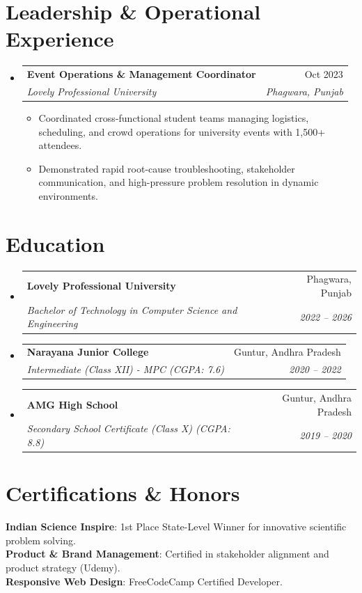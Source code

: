 \documentclass[letterpaper,10.8pt]{article}
\makeatletter
\newcommand{\resumeItem}[1]{
  \item\small{
    {#1 \vspace{-2.2pt}}
  }
}
\newcommand{\resumeSubheading}[4]{
  \vspace{-2pt}\item
    \begin{tabular*}{0.97\textwidth}[t]{l@{\extracolsep{\fill}}r}
      \textbf{#1} & #2 \\
      \textit{\small#3} & \textit{\small #4} \\
    \end{tabular*}\vspace{-6pt}
}
\newcommand{\resumeSubHeadingListStart}{\begin{itemize}[leftmargin=0.15in, label={}]}
\newcommand{\resumeSubHeadingListEnd}{\end{itemize}}
\newcommand{\resumeItemListStart}{\begin{itemize}[leftmargin=0.15in]}
\newcommand{\resumeItemListEnd}{\end{itemize}\vspace{-5pt}}
\makeatother
\begin{document}
\vspace{-12pt}

\section{Leadership \& Operational Experience}
    \resumeSubHeadingListStart
      \resumeSubheading
        {Event Operations \& Management Coordinator}{Oct 2023}
        {Lovely Professional University}{Phagwara, Punjab}
        \resumeItemListStart
          \resumeItem{Coordinated cross-functional student teams managing logistics, scheduling, and crowd operations for university events with 1,500+ attendees.}
          \resumeItem{Demonstrated rapid root-cause troubleshooting, stakeholder communication, and high-pressure problem resolution in dynamic environments.}
        \resumeItemListEnd
    \resumeSubHeadingListEnd

\vspace{-12pt}

\section{Education}
  \resumeSubHeadingListStart
    \resumeSubheading
      {Lovely Professional University}{Phagwara, Punjab}
      {Bachelor of Technology in Computer Science and Engineering}{2022 -- 2026}
    \resumeSubheading
      {Narayana Junior College}{Guntur, Andhra Pradesh}
      {Intermediate (Class XII) - MPC (CGPA: 7.6)}{2020 -- 2022}
    \resumeSubheading
      {AMG High School}{Guntur, Andhra Pradesh}
      {Secondary School Certificate (Class X) (CGPA: 8.8)}{2019 -- 2020}
  \resumeSubHeadingListEnd

\vspace{-12pt}

\section{Certifications \& Honors}
 \begin{itemize}[leftmargin=0.15in, label={}]
    \small{\item{
     \textbf{Indian Science Inspire}{: 1st Place State-Level Winner for innovative scientific problem solving.} \\ \vspace{1pt}
     \textbf{Product \& Brand Management}{: Certified in stakeholder alignment and product strategy (Udemy).} \\ \vspace{1pt}
     \textbf{Responsive Web Design}{: FreeCodeCamp Certified Developer.}
    }}
 \end{itemize}

\end{document}
